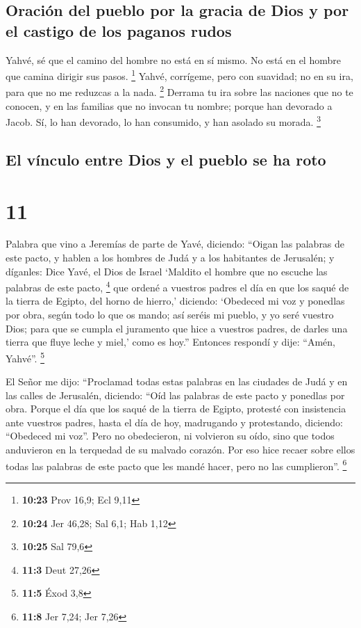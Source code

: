 \hypertarget{oraciuxf3n-del-pueblo-por-la-gracia-de-dios-y-por-el-castigo-de-los-paganos-rudos}{%
\subsection{Oración del pueblo por la gracia de Dios y por el castigo de
los paganos
rudos}\label{oraciuxf3n-del-pueblo-por-la-gracia-de-dios-y-por-el-castigo-de-los-paganos-rudos}}

 Yahvé, sé que el camino del hombre no está en sí mismo.
No está en el hombre que camina dirigir sus pasos. \footnote{\textbf{10:23}
  Prov 16,9; Ecl 9,11}  Yahvé, corrígeme, pero con
suavidad; no en su ira, para que no me reduzcas a la nada. \footnote{\textbf{10:24}
  Jer 46,28; Sal 6,1; Hab 1,12}  Derrama tu ira sobre las
naciones que no te conocen, y en las familias que no invocan tu nombre;
porque han devorado a Jacob. Sí, lo han devorado, lo han consumido, y
han asolado su morada. \footnote{\textbf{10:25} Sal 79,6}

\hypertarget{el-vuxednculo-entre-dios-y-el-pueblo-se-ha-roto}{%
\subsection{El vínculo entre Dios y el pueblo se ha
roto}\label{el-vuxednculo-entre-dios-y-el-pueblo-se-ha-roto}}

\hypertarget{section-10}{%
\section{11}\label{section-10}}

 Palabra que vino a Jeremías de parte de Yavé, diciendo:
 ``Oigan las palabras de este pacto, y hablen a los
hombres de Judá y a los habitantes de Jerusalén;  y
díganles: Dice Yavé, el Dios de Israel `Maldito el hombre que no escuche
las palabras de este pacto, \footnote{\textbf{11:3} Deut 27,26}
 que ordené a vuestros padres el día en que los saqué de
la tierra de Egipto, del horno de hierro,' diciendo: `Obedeced mi voz y
ponedlas por obra, según todo lo que os mando; así seréis mi pueblo, y
yo seré vuestro Dios;  para que se cumpla el juramento que
hice a vuestros padres, de darles una tierra que fluye leche y miel,'
como es hoy.'' Entonces respondí y dije: ``Amén, Yahvé''. \footnote{\textbf{11:5}
  Éxod 3,8}

 El Señor me dijo: ``Proclamad todas estas palabras en las
ciudades de Judá y en las calles de Jerusalén, diciendo: ``Oíd las
palabras de este pacto y ponedlas por obra.  Porque el día
que los saqué de la tierra de Egipto, protesté con insistencia ante
vuestros padres, hasta el día de hoy, madrugando y protestando,
diciendo: ``Obedeced mi voz''.  Pero no obedecieron, ni
volvieron su oído, sino que todos anduvieron en la terquedad de su
malvado corazón. Por eso hice recaer sobre ellos todas las palabras de
este pacto que les mandé hacer, pero no las cumplieron''. \footnote{\textbf{11:8}
  Jer 7,24; Jer 7,26}


